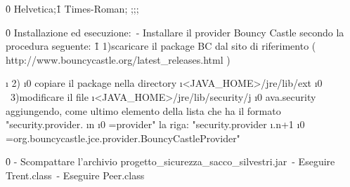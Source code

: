 {\ansi{}
{\fonttbl\f0\fswiss{} Helvetica;\f1\froman{} Times-Roman;}
{;;;}
\pard{}\ql\qnatural\pardirnatural

\f0  Installazione ed esecuzione:\
 - Installare il provider Bouncy Castle secondo la procedura seguente:
\f1\fs23\fsmilli11996 	1)scaricare il package BC dal sito di riferimento ( http://www.bouncycastle.org/latest_releases.html )\
\pard{}\ql\qnatural\pardirnatural

\i \cf0           2)
\i0 copiare il package nella directory 
\i <JAVA_HOME>/jre/lib/ext 
\i0 \
          3)modificare il file 
\i <JAVA_HOME>/jre/lib/security/j
\i0 ava.security aggiungendo, come ultimo elemento della lista che ha il formato "security.provider.
\i n
\i0 =provider" la riga: "security.provider
\i .n+1
\i0 =org.bouncycastle.jce.provider.BouncyCastleProvider"\
\pard{}\ql\qnatural\pardirnatural

\f0\fs24  - Scompattare l'archivio progetto_sicurezza_sacco_silvestri.jar\
- Eseguire Trent.class\
- Eseguire Peer.class\
}